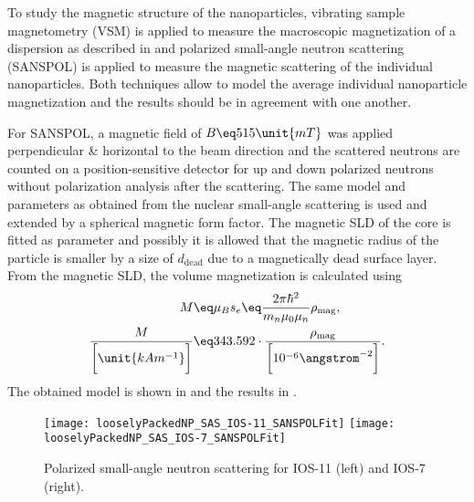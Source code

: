 \documentclass[\main/dresen_thesis.tex]{subfiles}
\begin{document}
  To study the magnetic structure of the nanoparticles, vibrating sample magnetometry (VSM) is applied to measure the macroscopic magnetization of a dispersion as described in  and polarized small-angle neutron scattering (SANSPOL) is applied to measure the magnetic scattering of the individual nanoparticles.
  Both techniques allow to model the average individual nanoparticle magnetization and the results should be in agreement with one another.

  For SANSPOL, a magnetic field of $B\eq 515 \unit{mT}$ was applied perpendicular \& horizontal to the beam direction and the scattered neutrons are counted on a position-sensitive detector for up and down polarized neutrons without polarization analysis after the scattering.
  The same model and parameters as obtained from the nuclear small-angle scattering is used and extended by a spherical magnetic form factor.
  The magnetic SLD of the core is fitted as parameter and possibly it is allowed that the magnetic radius of the particle is smaller by a size of $d_\mathrm{dead}$ due to a magnetically dead surface layer.
  From the magnetic SLD, the volume magnetization is calculated using 
  \begin{align}
    M \eq& \mu_B s_e \eq \frac{2 \pi \hbar^2}{m_n \mu_0 \mu_n} \rho_\mathrm{mag},\\
    \frac{M}{\bigg[\unit{kA m^{-1}}\bigg]} \eq& 343.592 \cdot \frac{\rho_\mathrm{mag}}{\bigg[10^{-6} \angstrom^{-2} \bigg]}.
  \end{align}
  The obtained model is shown in  and the results in .

  \begin{figure}[tb]
    \centering
    \texttt{[image: looselyPackedNP\_SAS\_IOS-11\_SANSPOLFit]}
    \texttt{[image: looselyPackedNP\_SAS\_IOS-7\_SANSPOLFit]}
    \caption{\label{fig:looselyPackedNP:nanoparticle:sanspol}Polarized small-angle neutron scattering for IOS-11 (left) and IOS-7 (right).}
  \end{figure}
\end{document}
